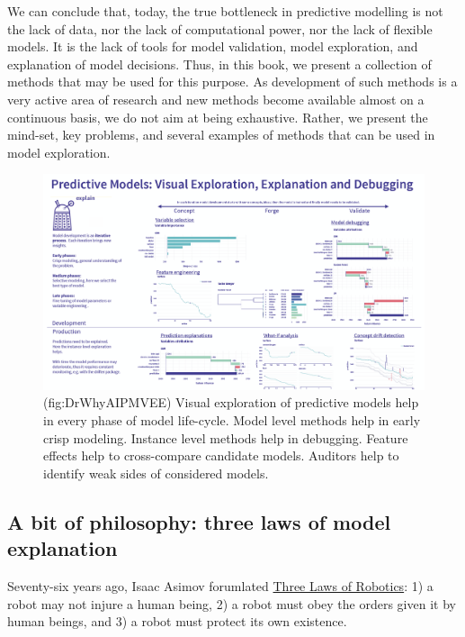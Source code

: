 \documentclass[12pt,]{krantz}
\theoremstyle{definition}
\theoremstyle{definition}
\theoremstyle{definition}
\theoremstyle{remark}
\begin{document}
We can conclude that, today, the true bottleneck in predictive modelling
is not the lack of data, nor the lack of computational power, nor the
lack of flexible models. It is the lack of tools for model validation,
model exploration, and explanation of model decisions. Thus, in this
book, we present a collection of methods that may be used for this
purpose. As development of such methods is a very active area of
research and new methods become available almost on a continuous basis,
we do not aim at being exhaustive. Rather, we present the mind-set, key
problems, and several examples of methods that can be used in model
exploration.

\begin{figure}

{\centering \includegraphics[width=0.99\linewidth]{figure/DrWhyAI_PMVEE} 

}

\caption{(fig:DrWhyAIPMVEE) Visual exploration of predictive models help in every phase of model life-cycle. Model level methods help in early crisp modeling. Instance level methods help in debugging. Feature effects help to cross-compare candidate models. Auditors help to identify weak sides of considered models.}\label{fig:DrWhyAIPMVEE}
\end{figure}

\hypertarget{three-single-laws}{%
\subsection{A bit of philosophy: three laws of model
explanation}\label{three-single-laws}}

Seventy-six years ago, Isaac Asimov forumlated
\href{https://en.wikipedia.org/wiki/Three_Laws_of_Robotics}{Three Laws
of Robotics}: 1) a robot may not injure a human being, 2) a robot must
obey the orders given it by human beings, and 3) a robot must protect
its own existence.
\end{document}
